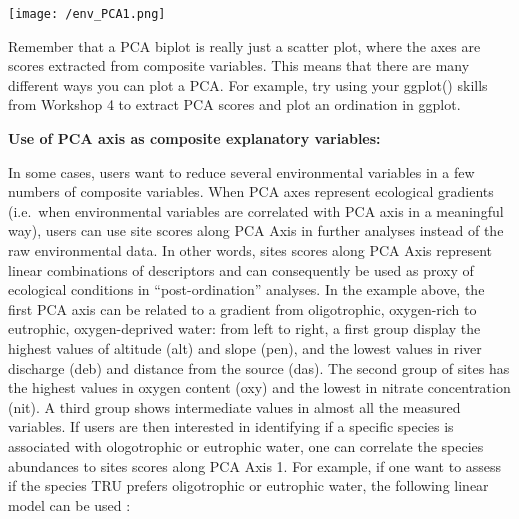 \documentclass[
]{book}
\newenvironment{Shaded}{\begin{snugshade}}{\end{snugshade}}
\newcommand{\AttributeTok}[1]{\textcolor[rgb]{0.77,0.63,0.00}{#1}}
\newcommand{\DecValTok}[1]{\textcolor[rgb]{0.00,0.00,0.81}{#1}}
\newcommand{\FunctionTok}[1]{\textcolor[rgb]{0.00,0.00,0.00}{#1}}
\newcommand{\NormalTok}[1]{#1}
\newcommand{\OtherTok}[1]{\textcolor[rgb]{0.56,0.35,0.01}{#1}}
\newcommand{\SpecialCharTok}[1]{\textcolor[rgb]{0.00,0.00,0.00}{#1}}
\newcommand{\StringTok}[1]{\textcolor[rgb]{0.31,0.60,0.02}{#1}}
\begin{document}
\texttt{[image: /env\_PCA1.png]}

Remember that a PCA biplot is really just a scatter plot, where the axes
are scores extracted from composite variables. This means that there are
many different ways you can plot a PCA. For example, try using your
ggplot() skills from Workshop 4 to extract PCA scores and plot an
ordination in ggplot.

\textbf{Use of PCA axis as composite explanatory variables:}

In some cases, users want to reduce several environmental variables in a
few numbers of composite variables. When PCA axes represent ecological
gradients (i.e.~when environmental variables are correlated with PCA
axis in a meaningful way), users can use site scores along PCA Axis in
further analyses instead of the raw environmental data. In other words,
sites scores along PCA Axis represent linear combinations of descriptors
and can consequently be used as proxy of ecological conditions in
``post-ordination'' analyses. In the example above, the first PCA axis can
be related to a gradient from oligotrophic, oxygen-rich to eutrophic,
oxygen-deprived water: from left to right, a first group display the
highest values of altitude (alt) and slope (pen), and the lowest values
in river discharge (deb) and distance from the source (das). The second
group of sites has the highest values in oxygen content (oxy) and the
lowest in nitrate concentration (nit). A third group shows intermediate
values in almost all the measured variables. If users are then
interested in identifying if a specific species is associated with
ologotrophic or eutrophic water, one can correlate the species
abundances to sites scores along PCA Axis 1. For example, if one want to
assess if the species TRU prefers oligotrophic or eutrophic water, the
following linear model can be used :

\begin{Shaded}
\end{Shaded}
\end{document}
